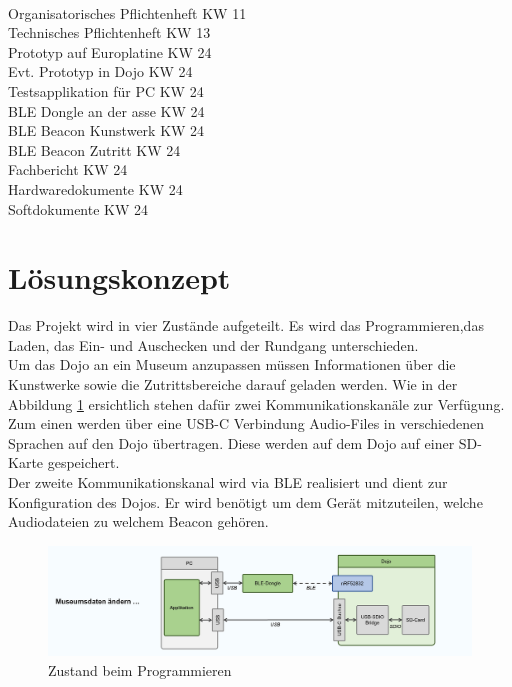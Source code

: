 \documentclass[10pt,a4paper,oneside]{99_fhnwreport}
\begin{document}
\begin{tabbing}
\hspace{80mm}		\= 	\\ %
Organisatorisches Pflichtenheft		\>	KW 11 \\
Technisches Pflichtenheft		\>	KW 13 \\
Prototyp auf Europlatine		\>	KW 24 \\
Evt. Prototyp in Dojo			\>	KW 24 \\
Testsapplikation für PC			\>	KW 24 \\
BLE Dongle  an der asse			\>	KW 24 \\
BLE Beacon Kunstwerk			\>	KW 24 \\
BLE Beacon Zutritt			\>	KW 24 \\
Fachbericht				\>	KW 24 \\
Hardwaredokumente			\>	KW 24 \\
Softdokumente				\>	KW 24 \\
\end{tabbing}

\section{Lösungskonzept}\label{sec:konzept}
Das Projekt wird in vier Zustände aufgeteilt. Es wird das Programmieren,das Laden, das Ein- und Auschecken und der Rundgang unterschieden.\\
Um das Dojo an ein Museum anzupassen müssen Informationen über die Kunstwerke sowie die Zutrittsbereiche darauf geladen werden. Wie in der Abbildung \ref{fig:image3} ersichtlich stehen dafür zwei Kommunikationskanäle zur Verfügung. Zum einen werden über eine USB-C Verbindung Audio-Files in verschiedenen Sprachen auf den Dojo übertragen. Diese werden auf dem Dojo auf einer SD-Karte gespeichert.\\
Der zweite Kommunikationskanal wird via BLE realisiert und dient zur Konfiguration des Dojos. Er wird benötigt um dem Gerät mitzuteilen, welche Audiodateien zu welchem Beacon gehören.

\begin{figure}[htb]
\includegraphics[width=\textwidth]{Zustand_Programmieren.png}
\caption{Zustand beim Programmieren} %
\label{fig:image3}
\end{figure}
\end{document}
